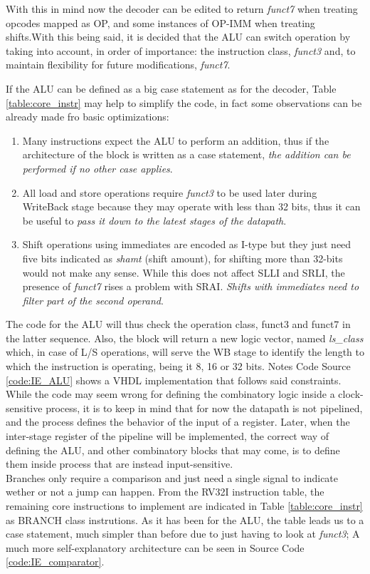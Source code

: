 With this in mind now the decoder can be edited to return \emph{funct7} when treating opcodes mapped as OP, and some instances of OP-IMM when treating shifts.With this being said, it is decided that the ALU can switch operation by taking into account, in order of importance: the instruction class, \emph{funct3} and, to maintain flexibility for future modifications, \emph{funct7}.


If the ALU can be defined as a big case statement as for the decoder, Table \ref{table:core_instr} may help to simplify the code, in fact some observations can be already made fro basic optimizations:
\begin{enumerate}
\item Many instructions expect the ALU to perform an addition, thus if the architecture of the block is written as a case statement, \emph{the addition can be performed if no other case applies}.
\item All load and store operations require \emph{funct3} to be used later during WriteBack stage because they may operate with less than 32 bits, thus it can be useful to \emph{pass it down to the latest stages of the datapath}.
\item Shift operations using immediates are encoded as I-type but they just need five bits indicated as \emph{shamt} (shift amount), for shifting more than 32-bits would not make any sense. While this does not affect SLLI and SRLI, the presence of \emph{funct7} rises a problem with SRAI. \emph{Shifts with immediates need to filter part of the second operand}.
\end{enumerate}
The code for the ALU will thus check the operation class, funct3 and funct7 in the latter sequence. Also, the block will return a new logic vector, named \emph{ls{\_}class} which, in case of L/S operations, will serve the WB stage to identify the length to which the instruction is operating, being it 8, 16 or 32 bits. Notes Code Source \ref{code:IE_ALU} shows a VHDL implementation that follows said constraints.\\
While the code may seem wrong for defining the combinatory logic inside a clock-sensitive process, it is to keep in mind that for now the datapath is not pipelined, and the process defines the behavior of the input of a register. Later, when the inter-stage register of the pipeline will be implemented, the correct way of defining the ALU, and other combinatory blocks that may come, is to define them inside process that are instead input-sensitive.\\
Branches only require a comparison and just need a single signal to indicate wether or not a jump can happen. From the RV32I instruction table, the remaining core instructions  to implement are indicated in Table \ref{table:core_instr} as BRANCH class instrutions. As it has been for the ALU, the table leads us to a case statement, much simpler than before due to just having to look at \emph{funct3}; A much more self-explanatory architecture can be seen in Source Code \ref{code:IE_comparator}.\\
